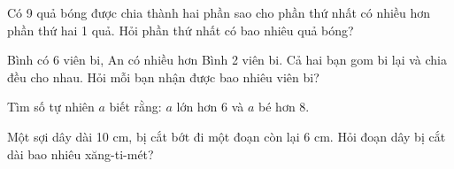 \begin{ex} %
Có 9 quả bóng được chia thành hai phần sao cho phần thứ nhất có nhiều hơn phần thứ hai 1 quả. Hỏi phần thứ nhất có bao nhiêu quả bóng?
\end{ex}

\begin{ex} %
Bình có 6 viên bi, An có nhiều hơn Bình 2 viên bi. Cả hai bạn gom bi lại và chia đều cho nhau. Hỏi mỗi bạn nhận được bao nhiêu viên bi?
\end{ex}

\begin{ex} %
Tìm số tự nhiên $a$ biết rằng: $a$ lớn hơn 6 và $a$ bé hơn 8.
\end{ex}

\begin{ex} %
Một sợi dây dài 10 cm, bị cắt bớt đi một đoạn còn lại 6 cm. Hỏi đoạn dây bị cắt dài bao nhiêu xăng-ti-mét?
\end{ex}
